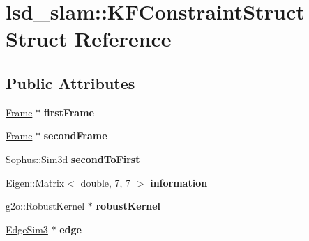 \hypertarget{structlsd__slam_1_1_k_f_constraint_struct}{\section{lsd\-\_\-slam\-:\-:K\-F\-Constraint\-Struct Struct Reference}
\label{structlsd__slam_1_1_k_f_constraint_struct}
}
\subsection*{Public Attributes}
\begin{DoxyCompactItemize}
\item 
\hypertarget{structlsd__slam_1_1_k_f_constraint_struct_a8f0cce58b7893cfc20db26e0e0390973}{\hyperlink{classlsd__slam_1_1_frame}{Frame} $\ast$ {\bfseries first\-Frame}}\label{structlsd__slam_1_1_k_f_constraint_struct_a8f0cce58b7893cfc20db26e0e0390973}

\item 
\hypertarget{structlsd__slam_1_1_k_f_constraint_struct_aa98538143de8fedbf6f9d0f911c897f0}{\hyperlink{classlsd__slam_1_1_frame}{Frame} $\ast$ {\bfseries second\-Frame}}\label{structlsd__slam_1_1_k_f_constraint_struct_aa98538143de8fedbf6f9d0f911c897f0}

\item 
\hypertarget{structlsd__slam_1_1_k_f_constraint_struct_af270b4ccf00a399edb46d22212d3742c}{Sophus\-::\-Sim3d {\bfseries second\-To\-First}}\label{structlsd__slam_1_1_k_f_constraint_struct_af270b4ccf00a399edb46d22212d3742c}

\item 
\hypertarget{structlsd__slam_1_1_k_f_constraint_struct_ac5d4ed69143845a556a648753c3188a2}{Eigen\-::\-Matrix$<$ double, 7, 7 $>$ {\bfseries information}}\label{structlsd__slam_1_1_k_f_constraint_struct_ac5d4ed69143845a556a648753c3188a2}

\item 
\hypertarget{structlsd__slam_1_1_k_f_constraint_struct_a38bff9ba91ca70d2bfdd34492ea4dd5d}{g2o\-::\-Robust\-Kernel $\ast$ {\bfseries robust\-Kernel}}\label{structlsd__slam_1_1_k_f_constraint_struct_a38bff9ba91ca70d2bfdd34492ea4dd5d}

\item 
\hypertarget{structlsd__slam_1_1_k_f_constraint_struct_a0f01605816cb3ae6c5ec8272ca84cf29}{\hyperlink{classlsd__slam_1_1_edge_sim3}{Edge\-Sim3} $\ast$ {\bfseries edge}}\label{structlsd__slam_1_1_k_f_constraint_struct_a0f01605816cb3ae6c5ec8272ca84cf29}


\end{DoxyCompactItemize}
